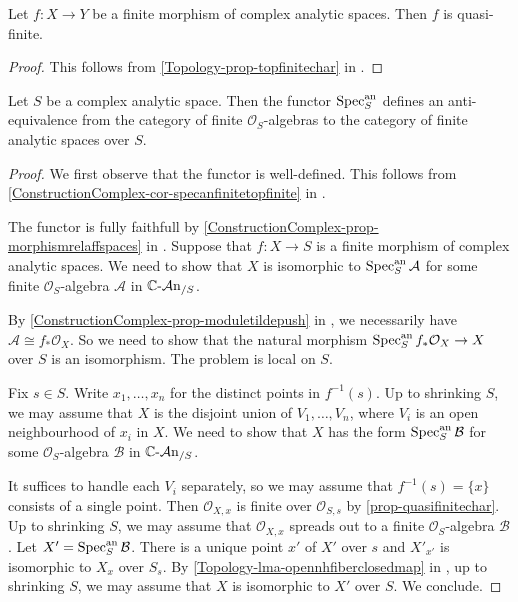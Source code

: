 \begin{proposition}
    Let $f:X\rightarrow Y$ be a finite morphism of complex analytic spaces. Then $f$ is quasi-finite.
\end{proposition}
\begin{proof}
    This follows from \cref{Topology-prop-topfinitechar} in .
\end{proof}

\begin{thm}\label{thm-finitealgeqfiniteanalyticspace}
    Let $S$ be a complex analytic space. Then the functor $\operatorname{Spec}^{\mathrm{an}}_S$ defines an anti-equivalence from the category of finite $\mathcal{O}_S$-algebras to the category of finite analytic spaces over $S$.
\end{thm}
\begin{proof}
    We first observe that the functor is well-defined. This follows from \cref{ConstructionComplex-cor-specanfinitetopfinite} in .

    The functor is fully faithfull by \cref{ConstructionComplex-prop-morphismrelaffspaces} in . Suppose that $f:X\rightarrow S$ is a finite morphism of complex analytic spaces. We need to show that $X$ is isomorphic to $\operatorname{Spec}^{\mathrm{an}}_{S}\mathcal{A}$ for some finite $\mathcal{O}_S$-algebra $\mathcal{A}$ in $\mathbb{C}\text{-}\mathcal{A}\mathrm{n}_{/S}$.

    By \cref{ConstructionComplex-prop-moduletildepush} in , we necessarily have $\mathcal{A}\cong f_*\mathcal{O}_X$. So we need to show that the natural morphism $\operatorname{Spec}_S^{\mathrm{an}} f_*\mathcal{O}_X\rightarrow X$ over $S$ is an isomorphism. The problem is local on $S$. 

    Fix $s\in S$. Write $x_1,\ldots,x_n$ for the distinct points in $f^{-1}(s)$.
    Up to shrinking $S$, we may assume that $X$ is the disjoint union of $V_1,\ldots,V_n$, where $V_i$ is an open neighbourhood of $x_i$ in $X$. 
    We need to show that $X$ has the form $\operatorname{Spec}^{\mathrm{an}}_S \mathcal{B}$ for some $\mathcal{O}_S$-algebra $\mathcal{B}$ in $\mathbb{C}\text{-}\mathcal{A}\mathrm{n}_{/S}$.

    It suffices to handle each $V_i$ separately, so we may assume that $f^{-1}(s)=\{x\}$ consists of a single point. Then $\mathcal{O}_{X,x}$ is finite over $\mathcal{O}_{S,s}$ by \cref{prop-quasifinitechar}. Up to shrinking $S$, we may assume that $\mathcal{O}_{X,x}$ spreads out to a finite $\mathcal{O}_S$-algebra $\mathcal{B}$. Let $X'=\operatorname{Spec}^{\mathrm{an}}_{S}\mathcal{B}$. There is a unique point $x'$ of $X'$ over $s$ and $X'_{x'}$ is isomorphic to $X_x$ over $S_s$. By \cref{Topology-lma-opennhfiberclosedmap} in , up to shrinking $S$, we may assume that $X$ is isomorphic to $X'$ over $S$. We conclude.
\end{proof}

